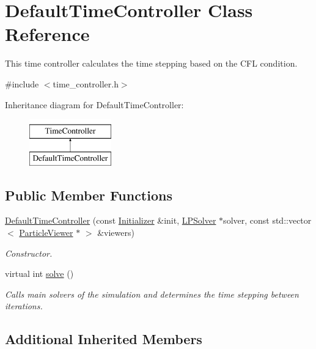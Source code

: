 \hypertarget{classDefaultTimeController}{\section{Default\-Time\-Controller Class Reference}
\label{classDefaultTimeController}
}


This time controller calculates the time stepping based on the C\-F\-L condition.  




{\ttfamily \#include $<$time\-\_\-controller.\-h$>$}

Inheritance diagram for Default\-Time\-Controller\-:\begin{figure}[H]
\begin{center}
\leavevmode
\includegraphics[height=2.000000cm]{classDefaultTimeController}
\end{center}
\end{figure}
\subsection*{Public Member Functions}
\begin{DoxyCompactItemize}
\item 
\hyperlink{classDefaultTimeController_a7664ecb4e31ff04870353492bdbb337e}{Default\-Time\-Controller} (const \hyperlink{classInitializer}{Initializer} \&init, \hyperlink{classLPSolver}{L\-P\-Solver} $\ast$solver, const std\-::vector$<$ \hyperlink{classParticleViewer}{Particle\-Viewer} $\ast$ $>$ \&viewers)
\begin{DoxyCompactList}\small\item\em Constructor. \end{DoxyCompactList}\item 
virtual int \hyperlink{classDefaultTimeController_a25ac85307f49f9f304a78d648b5676d7}{solve} ()
\begin{DoxyCompactList}\small\item\em Calls main solvers of the simulation and determines the time stepping between iterations. \end{DoxyCompactList}\end{DoxyCompactItemize}
\subsection*{Additional Inherited Members}


